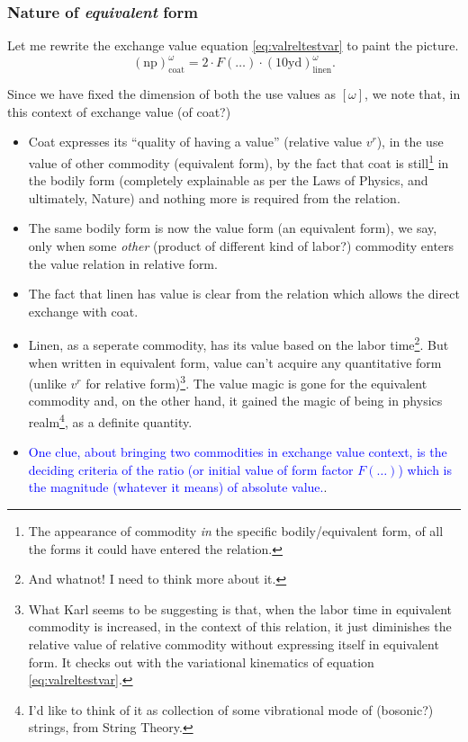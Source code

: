 \documentclass[12pt]{extarticle}
\theoremstyle{definition}
\newenvironment{remark}[1][Remark]{\begin{trivlist}
\item[\hskip \labelsep {\bfseries #1}]}{\end{trivlist}}
\begin{document}
\subsubsection{Nature of \emph{equivalent} form}
Let me rewrite the exchange value equation \ref{eq:valreltestvar} to paint the picture.
\begin{equation}
  \label{eq:exvalrep}
   (\text{np})_{\text{coat}}^{\omega} = 2\cdot F(\ldots)\cdot (10\text{yd})_{\text{linen}}^{\omega}.
 \end{equation}
 \begin{remark}
   Since we have fixed the dimension of both the use values as $[\omega]$, we note that, in this context of exchange value (of coat?)
   \begin{itemize}
   \item Coat expresses its ``quality of having a value'' (relative value $v^r$), in the use value of other commodity (equivalent form), by the fact that coat is still\footnote{The appearance of commodity \emph{in} the specific bodily/equivalent form, of all the forms it could have entered the relation.} in the bodily form (completely explainable as per the Laws of Physics, and ultimately, Nature) and nothing more is required from the relation.
   \item The same bodily form is now the value form (an equivalent form), we say, only when some \emph{other} (product of different kind of labor?) commodity enters the value relation in relative form.
   \item The fact that linen has value is clear from the relation which allows the direct exchange with coat.
   \item Linen, as a seperate commodity, has its value based on the labor time\footnote{And whatnot!  I need to think more about it.}.  But when written in equivalent form, value can't acquire any quantitative form (unlike $v^r$ for relative form)\footnote{What Karl seems to be suggesting is that, when the labor time in equivalent commodity is increased, in the context of this relation, it just diminishes the relative value of relative commodity without expressing itself in equivalent form.  It checks out with the variational kinematics of equation \ref{eq:valreltestvar}.}.  The value magic is gone for the equivalent commodity and, on the other hand, it gained the magic of being in physics realm\footnote{I'd like to think of it as collection of some vibrational mode of (bosonic?) strings, from String Theory.}, as a definite quantity.
   \item \textcolor{blue}{One clue, about bringing two commodities in exchange value context, is the deciding criteria of the ratio (or initial value of form factor $F(\ldots)$) which is the magnitude (whatever it means) of absolute value.}.

\end{itemize}
\end{remark}
\end{document}
